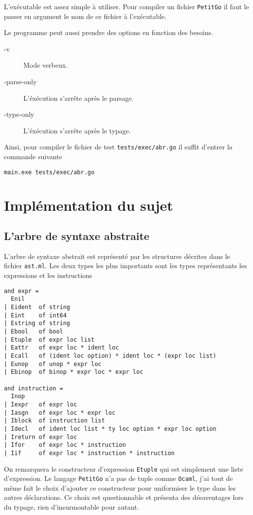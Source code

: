 \documentclass{article}
\begin{document}
L'exécutable est assez simple à utiliser. Pour compiler un fichier \texttt{PetitGo} il faut le passer en argument le nom de ce fichier à l'exécutable.

Le programme peut aussi prendre des options en fonction des besoins.

\begin{description}
\item[-v] Mode verbeux.
\item[-\-parse-only] L'éxécution s'arrête après le parsage.
\item[-\-type-only] L'éxécution s'arrête après le typage.
\end{description}

Ainsi, pour compiler le fichier de test \texttt{tests/exec/abr.go} il suffit d'entrer la commande suivante

\begin{verbatim}
main.exe tests/exec/abr.go
\end{verbatim}

\section{Implémentation du sujet}

\subsection{L'arbre de syntaxe abstraite\label{sec:ast}}

L'arbre de syntaxe abstrait est représenté par les structures décrites dans le fichier \texttt{ast.ml}. Les deux types les plus importants sont les types représentants les expressions et les instructions

\begin{verbatim}
and expr =
  Enil
| Eident  of string
| Eint    of int64
| Estring of string
| Ebool   of bool
| Etuple  of expr loc list
| Eattr   of expr loc * ident loc
| Ecall   of (ident loc option) * ident loc * (expr loc list)
| Eunop   of unop * expr loc
| Ebinop  of binop * expr loc * expr loc

and instruction =
  Inop
| Iexpr   of expr loc
| Iasgn   of expr loc * expr loc
| Iblock  of instruction list
| Idecl   of ident loc list * ty loc option * expr loc option
| Ireturn of expr loc
| Ifor    of expr loc * instruction
| Iif     of expr loc * instruction * instruction
\end{verbatim}

On remarquera le constructeur d'expression \texttt{Etuple} qui est simplement une liste d'expression. Le langage \texttt{PetitGo} n'a pas de tuple comme \texttt{Ocaml}, j'ai tout de même fait le choix d'ajouter ce constructeur pour uniformiser le type dans les autres déclarations. Ce choix est questionnable et présenta des désaventages lors du typage, rien d'insurmontable pour autant.
\end{document}
